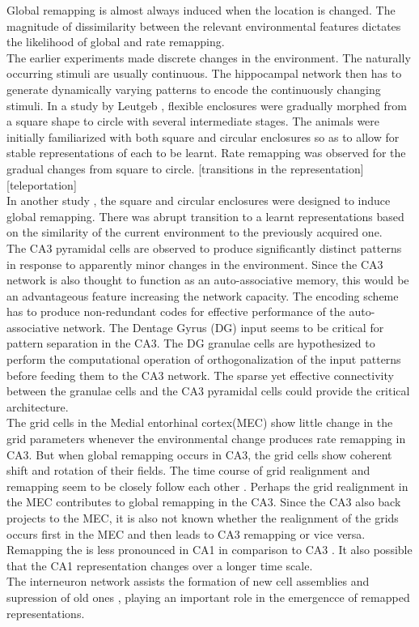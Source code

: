Global remapping is almost always induced when the location is changed. The magnitude of dissimilarity between the relevant environmental features dictates the likelihood of global and rate remapping. \\
The earlier experiments made discrete changes in the environment. The naturally occurring stimuli are usually continuous. The hippocampal network then has to generate dynamically varying patterns to encode the continuously changing stimuli. In a study by Leutgeb \cite{Leutgeb2005}, flexible enclosures were gradually morphed from a square shape to circle with several intermediate stages. The animals were initially familiarized with both square and circular enclosures so as to allow for stable representations of each to be learnt. Rate remapping was observed for the gradual changes from square to circle.  [transitions in the representation] [teleportation]\\
In another study \cite{Wills2005}, the square and circular enclosures were designed to induce global remapping. There was abrupt transition to a learnt representations based on the similarity of the current environment to the previously acquired one. \\
The CA3 pyramidal cells are observed to produce significantly distinct patterns in response to apparently minor changes in the environment. Since the CA3 network is also thought to function as an auto-associative memory, this would be an advantageous feature increasing the network capacity. The encoding scheme has to produce non-redundant codes for effective performance of the auto-associative network. The Dentage Gyrus (DG) input seems to be critical for pattern separation in the CA3. The DG granulae cells are hypothesized to perform the computational operation of orthogonalization of the input patterns before feeding them to the CA3 network. The sparse yet effective connectivity between the granulae cells and the CA3 pyramidal cells could provide the critical architecture.\\ The grid cells in the Medial entorhinal cortex(MEC) show little change in the grid parameters whenever the environmental change produces rate remapping in CA3. But when global remapping occurs in CA3, the grid cells show coherent shift and rotation of their fields. The time course of grid realignment and remapping seem to be closely follow each other \cite{Fyhn2007}. Perhaps the grid realignment in the MEC contributes to global remapping in the CA3. Since the CA3 also back projects to the MEC, it is also not known whether the realignment of the grids occurs first in the MEC and then leads to CA3 remapping or vice versa. Remapping the is less pronounced in CA1 in comparison to CA3 \cite{Leutgeb2005a, Leutgeb2004}. It also possible that the CA1 representation changes over a longer time scale. \\ 
The interneuron network assists the formation of new cell assemblies and supression of old ones \cite{Dupret2013}, playing an important role in the emergencce of remapped representations.

